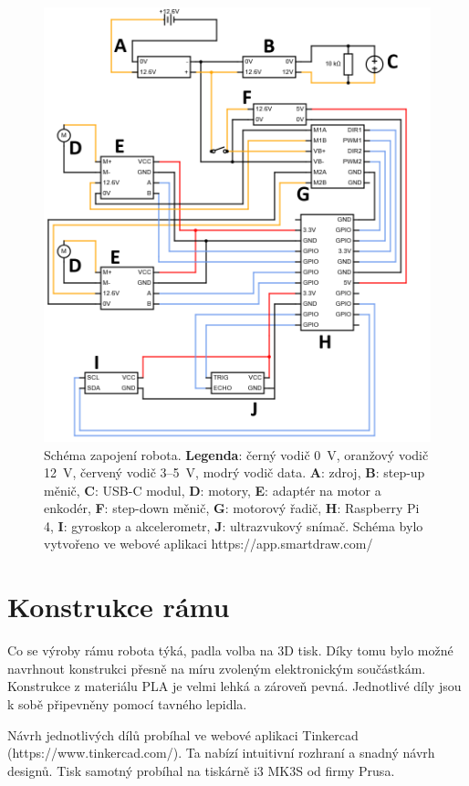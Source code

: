 \begin{figure}[H]
    \centering
    \includegraphics[width=1\linewidth]{obrazky-figures/circ.png}
    \caption {Schéma zapojení robota. \textbf{Legenda}: černý vodič 0~V, oranžový vodič 12~V, červený vodič 3--5~V, modrý vodič data. \textbf{A}: zdroj, \textbf{B}: step-up měnič, \textbf{C}: USB-C modul, \textbf{D}: motory, \textbf{E}: adaptér na motor a enkodér, \textbf{F}: step-down měnič, \textbf{G}: motorový řadič, \textbf{H}: Raspberry Pi 4, \textbf{I}: gyroskop a akcelerometr, \textbf{J}: ultrazvukový snímač. Schéma bylo vytvořeno ve webové aplikaci https://app.smartdraw.com/}
    \label{schema}
\end{figure}


\section{Konstrukce rámu}
Co se výroby rámu robota týká, padla volba na 3D tisk. Díky tomu bylo možné navrhnout konstrukci přesně na míru zvoleným elektronickým součástkám. Konstrukce z materiálu PLA je velmi lehká a zároveň pevná. Jednotlivé díly jsou k sobě připevněny pomocí tavného lepidla.

Návrh jednotlivých dílů probíhal ve webové aplikaci Tinkercad (https://www.tinkercad.com/). Ta nabízí intuitivní rozhraní a snadný návrh designů. Tisk samotný probíhal na tiskárně i3 MK3S od firmy Prusa.

